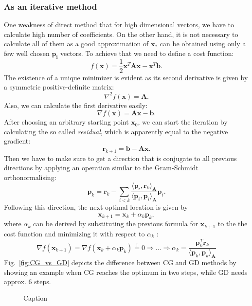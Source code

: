 \subsubsection{As an iterative method} One weakness of direct method that for high dimensional vectors, we have to calculate high number of coefficients. On the other hand, it is not necessary to calculate all of them as a good approximation of $\mathbf{x_* }$ can be obtained using only a few well chosen $\mathbf{p_i}$ vectors. To achieve that we need to define a cost function:
$$f(\mathbf{x}) = \frac{1}{2}\mathbf{x}^T \mathbf{Ax} - \mathbf{x}^T \mathbf{b}.$$
The existence of a unique minimizer is evident as its second derivative is given by a symmetric positive-definite matrix:
$$\nabla^2 f(\mathbf{x}) = \mathbf{A}.$$
Also, we can calculate the first derivative easily:
$$\nabla f(\mathbf{x}) = \mathbf{Ax} - \mathbf{b}.$$
After choosing an arbitrary starting point $\mathbf{x}_0$, we can start the iteration by calculating the so called \textit{residual}, which is apparently equal to the negative gradient:
$$\mathbf{r}_{k+1} = \mathbf{b} - \mathbf{Ax}.$$
Then we have to make sure to get a direction that is conjugate to all previous directions by applying an operation similar to the Gram-Schmidt orthonormalising:
$$\mathbf{p}_k = \mathbf{r}_k - \sum_{i<k} \frac{\langle \mathbf{p}_i, \mathbf{r}_k \rangle_\mathbf{A}}{\langle \mathbf{p}_i, \mathbf{p}_i \rangle_\mathbf{A}} \mathbf{p}_i.$$
Following this direction, the next optimal location is given by
$$\mathbf{x}_{k+1} = \mathbf{x}_k + \alpha_k \mathbf{p}_k,$$
where $\alpha_k$ can be derived by substituting the previous formula for $\mathbf{x}_{k+1}$ to the the cost function and minimizing it with respect to $\alpha_k$ :
$$\nabla f(\mathbf{x}_{k+1}) = \nabla f(\mathbf{x}_k + \alpha_k \mathbf{p}_k)  \overset{!}{=} 0 \Rightarrow ... \Rightarrow \alpha_k = \frac{\mathbf{p}_k^T \mathbf{r}_k}{\langle \mathbf{p}_k, \mathbf{p}_k \rangle_\mathbf{A}}$$
Fig.~\ref{fig:CG_vs_GD} depicts the difference between CG and GD methods by showing an example when CG reaches the optimum in two steps, while GD needs approx. 6 steps.

\begin{figure}
    \centering
    \minipage
    \caption{Caption}
    \label{fig:my_label}
\end{figure}

